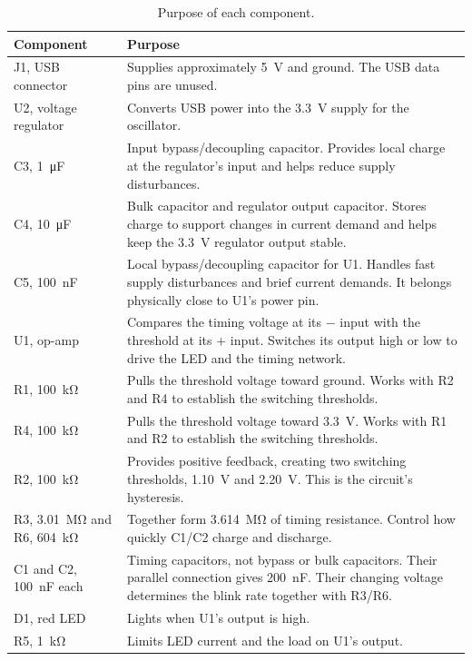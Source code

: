 \documentclass[11pt]{article}
\begin{document}
\begin{table}[H]
  \centering
  \small
  \begin{tabular}{@{}p{3.6cm}p{13cm}@{}}
    \toprule
    Component & Purpose \\
    \midrule
    J1, USB connector & Supplies approximately \qty{5}{\volt} and ground. The USB data pins are unused. \\
    U2, voltage regulator & Converts USB power into the \qty{3.3}{\volt} supply for the oscillator. \\
    C3, \qty{1}{\micro\farad} & Input bypass/decoupling capacitor. Provides local charge at the regulator's input and helps reduce supply disturbances. \\
    C4, \qty{10}{\micro\farad} & Bulk capacitor and regulator output capacitor. Stores charge to support changes in current demand and helps keep the \qty{3.3}{\volt} regulator output stable. \\
    C5, \qty{100}{\nano\farad} & Local bypass/decoupling capacitor for U1. Handles fast supply disturbances and brief current demands. It belongs physically close to U1's power pin. \\
    U1, op-amp & Compares the timing voltage at its $-$ input with the threshold at its $+$ input. Switches its output high or low to drive the LED and the timing network. \\
    R1, \qty{100}{\kilo\ohm} & Pulls the threshold voltage toward ground. Works with R2 and R4 to establish the switching thresholds. \\
    R4, \qty{100}{\kilo\ohm} & Pulls the threshold voltage toward \qty{3.3}{\volt}. Works with R1 and R2 to establish the switching thresholds. \\
    R2, \qty{100}{\kilo\ohm} & Provides positive feedback, creating two switching thresholds, \qty{1.10}{\volt} and \qty{2.20}{\volt}. This is the circuit's hysteresis. \\
    R3, \qty{3.01}{\mega\ohm} and R6, \qty{604}{\kilo\ohm} & Together form \qty{3.614}{\mega\ohm} of timing resistance. Control how quickly C1/C2 charge and discharge. \\
    C1 and C2, \qty{100}{\nano\farad} each & Timing capacitors, not bypass or bulk capacitors. Their parallel connection gives \qty{200}{\nano\farad}. Their changing voltage determines the blink rate together with R3/R6. \\
    D1, red LED & Lights when U1's output is high. \\
    R5, \qty{1}{\kilo\ohm} & Limits LED current and the load on U1's output. \\
    \bottomrule
  \end{tabular}
  \caption{Purpose of each component.}
  \label{tab:components}
\end{table}
\end{document}
